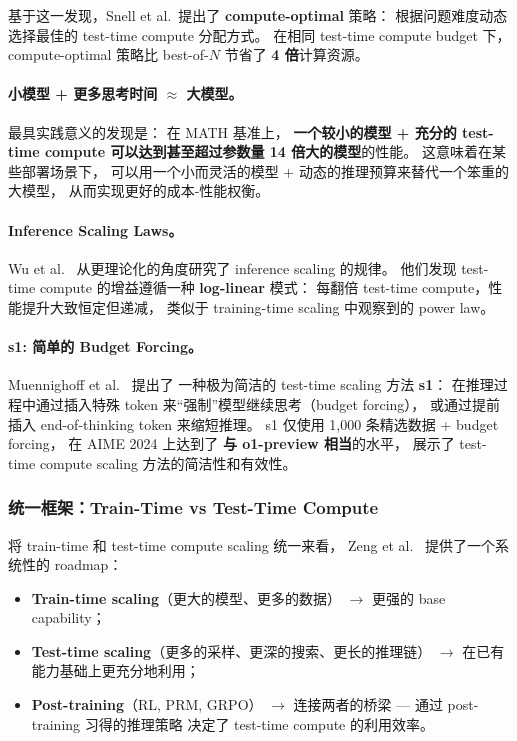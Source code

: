 \noindent
基于这一发现，Snell et al.\ 提出了 \textbf{compute-optimal} 策略：
根据问题难度动态选择最佳的 test-time compute 分配方式。
在相同 test-time compute budget 下，
compute-optimal 策略比 best-of-$N$ 节省了 \textbf{4 倍}计算资源。

\paragraph{小模型 + 更多思考时间 $\approx$ 大模型。}
最具实践意义的发现是：
在 MATH 基准上，
\textbf{一个较小的模型 + 充分的 test-time compute
可以达到甚至超过参数量 14 倍大的模型}的性能。
这意味着在某些部署场景下，
可以用一个小而灵活的模型 + 动态的推理预算来替代一个笨重的大模型，
从而实现更好的成本-性能权衡。

\paragraph{Inference Scaling Laws。}
Wu et al.\ \cite{wu2024inferencescaling} 从更理论化的角度研究了
inference scaling 的规律。
他们发现 test-time compute 的增益遵循一种 \textbf{log-linear} 模式：
每翻倍 test-time compute，性能提升大致恒定但递减，
类似于 training-time scaling 中观察到的 power law。

\paragraph{s1: 简单的 Budget Forcing。}
Muennighoff et al.\ \cite{muennighoff2025s1} 提出了
一种极为简洁的 test-time scaling 方法 \textbf{s1}：
在推理过程中通过插入特殊 token 来``强制''模型继续思考（budget forcing），
或通过提前插入 end-of-thinking token 来缩短推理。
s1 仅使用 1,000 条精选数据 + budget forcing，
在 AIME 2024 上达到了 \textbf{与 o1-preview 相当}的水平，
展示了 test-time compute scaling 方法的简洁性和有效性。

\subsubsection{统一框架：Train-Time vs Test-Time Compute}

将 train-time 和 test-time compute scaling 统一来看，
Zeng et al.\ \cite{zeng2024roadmapo1} 提供了一个系统性的 roadmap：
\begin{itemize}[leftmargin=2em]
  \item \textbf{Train-time scaling}（更大的模型、更多的数据）
    $\rightarrow$ 更强的 base capability；
  \item \textbf{Test-time scaling}（更多的采样、更深的搜索、更长的推理链）
    $\rightarrow$ 在已有能力基础上更充分地利用；
  \item \textbf{Post-training}（RL, PRM, GRPO）
    $\rightarrow$ 连接两者的桥梁 --- 通过 post-training 习得的推理策略
    决定了 test-time compute 的利用效率。
\end{itemize}

